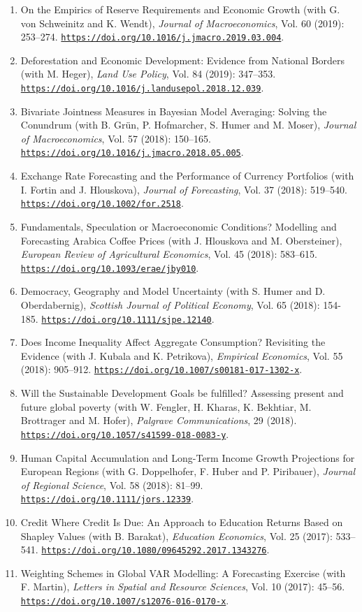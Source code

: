 \documentclass[10pt]{res} %
\newcommand{\doiurl}[1]{\href{https://doi.org/#1}{\nolinkurl{https://doi.org/#1}}}
\begin{document}
\begin{resume}
\begin{enumerate}
\item On the Empirics of Reserve Requirements and Economic Growth (with G. von Schweinitz and K. Wendt), \textit{Journal of Macroeconomics}, Vol. 60 (2019): 253--274. \doiurl{10.1016/j.jmacro.2019.03.004}.
\item Deforestation and Economic Development: Evidence from National Borders (with M. Heger),\textit{ Land Use Policy}, Vol. 84 (2019): 347--353. \doiurl{10.1016/j.landusepol.2018.12.039}.
\item Bivariate Jointness Measures in Bayesian Model Averaging: Solving the Conundrum (with B. Gr\"un, P. Hofmarcher, S. Humer and M. Moser), \textit{Journal of Macroeconomics}, Vol. 57 (2018): 150--165. \doiurl{10.1016/j.jmacro.2018.05.005}.
\item Exchange Rate Forecasting and the Performance of Currency Portfolios (with I. Fortin and J. Hlouskova), \textit{Journal of Forecasting}, Vol. 37 (2018): 519--540. \doiurl{10.1002/for.2518}.
\item Fundamentals, Speculation or Macroeconomic Conditions? Modelling and Forecasting Arabica Coffee Prices (with J. Hlouskova and M. Obersteiner), \textit{European Review of Agricultural Economics}, Vol. 45 (2018): 583--615. \doiurl{10.1093/erae/jby010}.
\item Democracy, Geography and Model Uncertainty (with S. Humer and D. Oberdabernig),\textit{ Scottish Journal of Political Economy}, Vol. 65 (2018): 154-185. \doiurl{10.1111/sjpe.12140}.
\item Does Income Inequality Affect Aggregate Consumption? Revisiting the Evidence (with J. Kubala and K. Petrikova), \textit{Empirical Economics}, Vol. 55 (2018): 905--912. \doiurl{10.1007/s00181-017-1302-x}.
\item Will the Sustainable Development Goals be fulfilled? Assessing present and future global poverty (with W. Fengler, H. Kharas, K. Bekhtiar, M. Brottrager and M. Hofer),\textit{ Palgrave Communications}, 29 (2018). \doiurl{10.1057/s41599-018-0083-y}.
\item Human Capital Accumulation and Long-Term Income Growth Projections for European Regions (with G. Doppelhofer, F. Huber and P. Piribauer), \textit{Journal of Regional Science}, Vol. 58 (2018): 81--99. \doiurl{10.1111/jors.12339}.
\item Credit Where Credit Is Due: An Approach to Education Returns Based on Shapley Values (with B. Barakat), \textit{Education Economics}, Vol. 25 (2017): 533--541. \doiurl{10.1080/09645292.2017.1343276}.
\item Weighting Schemes in Global VAR Modelling: A Forecasting Exercise (with F. Martin), \textit{Letters in Spatial and Resource Sciences}, Vol. 10 (2017): 45--56. \doiurl{10.1007/s12076-016-0170-x}.

\end{enumerate}
\end{resume}
\end{document}
